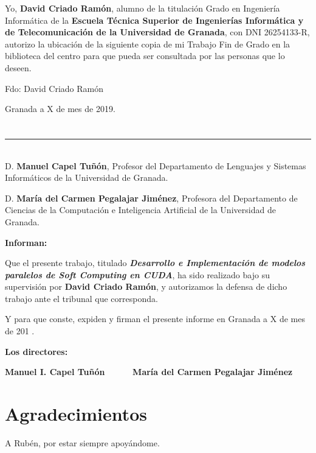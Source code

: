 Yo, \textbf{David Criado Ramón}, alumno de la titulación Grado en Ingeniería Informática de la \textbf{Escuela Técnica Superior
de Ingenierías Informática y de Telecomunicación de la Universidad de Granada}, con DNI 26254133-R, autorizo la
ubicación de la siguiente copia de mi Trabajo Fin de Grado en la biblioteca del centro para que pueda ser
consultada por las personas que lo deseen.

\vspace{6cm}

\noindent Fdo: David Criado Ramón

\vspace{2cm}

\begin{flushright}
Granada a X de mes de 2019.
\end{flushright}


\chapter*{}
\thispagestyle{empty}
\noindent\rule[-1ex]{\textwidth}{1pt}\\[4.5ex]
D. \textbf{Manuel Capel Tuñón}, Profesor del Departamento de Lenguajes y Sistemas Informáticos de la Universidad de Granada.

\vspace{0.5cm}

D. \textbf{María del Carmen Pegalajar Jiménez}, Profesora del Departamento de Ciencias de la Computación e Inteligencia Artificial de la Universidad de Granada.


\vspace{0.5cm}

\textbf{Informan:}

\vspace{0.5cm}

Que el presente trabajo, titulado \textit{\textbf{Desarrollo e Implementación de modelos paralelos de Soft Computing en CUDA}},
ha sido realizado bajo su supervisión por \textbf{David Criado Ramón}, y autorizamos la defensa de dicho trabajo ante el tribunal
que corresponda.

\vspace{0.5cm}

Y para que conste, expiden y firman el presente informe en Granada a X de mes de 201 .

\vspace{1cm}

\textbf{Los directores:}

\vspace{4cm}

\noindent \textbf{Manuel I. Capel Tuñón \ \ \ \ \ María del Carmen Pegalajar Jiménez}

\chapter*{Agradecimientos}
\thispagestyle{empty}

       \vspace{1cm}


A Rubén, por estar siempre apoyándome.